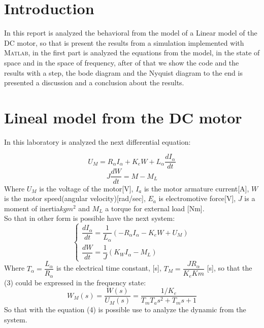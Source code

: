 \documentclass[12pt]{article}
\newcommand{\Matlab}{\textsc{Matlab}}
\begin{document}





\textbf{}\setcounter{page}{1}
\section{Introduction}
In this report is analyzed the behavioral from the model of a Linear model of the DC motor, so that is present the results from a simulation implemented with \Matlab, in the first part is analyzed the equations from the model, in the state of space and in the space of frequency, after of that we show the code and the results with a step, the bode diagram and the Nyquist diagram to the end is presented a discussion and a conclusion about the results.
\section{Lineal model from the DC motor}
In this laboratory is analyzed the next differential equation:

\begin{equation}
U_{M}=R_{\alpha}I_{\alpha}+K_{e}W+L_{\alpha}\dfrac{dI_{\alpha}}{dt}
\end{equation}
\begin{equation}
J\dfrac{dW}{dt}=M-M_{L}
\end{equation}
Where $U_{M}$ is the voltage of the motor[V], $I_{a}$ is the motor armature current[A], $W$ is the motor speed(angular velocity)[rad/sec], $E_a$ is electromotive force[V], $J$ is a moment of inertia$kgm^{2}$ and $M_{L}$ a torque for external load [Nm].\\
So that in other form is possible have the next system:
\begin{equation}
\begin{cases}
\dfrac{dI_{\alpha}}{dt}=\dfrac{1}{L_{\alpha}}(-R_{\alpha}I_{\alpha}-K_{e}W+U_{M})\\
\dfrac{dW}{dt}=\dfrac{1}{J}(K_{W}I_{\alpha}-M_{L})
\end{cases}
\end{equation}
Where $T_{\alpha}=\dfrac{L_{\alpha}}{R_{\alpha}}$ is the electrical time constant, [s], $T_{M}=\dfrac{JR_{\alpha}}{K_{e}K{m}}$ [s], so that the (3) could be expressed in the frequency state:\\
\begin{equation}
W_{M}(s)=\dfrac{W(s)}{U_{M}(s)}=\dfrac{1/K_{e}}{T_{m}T_{a}s^{2}+T_{m}s+1}
\end{equation}
So that with the equation (4) is possible use to analyze the dynamic from the system.
\end{document}
